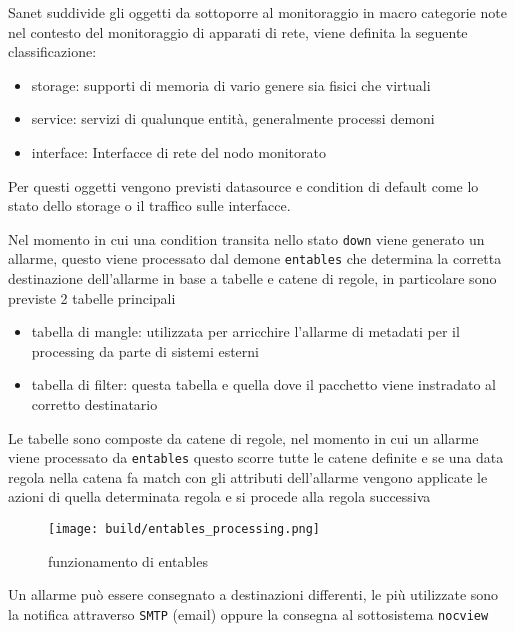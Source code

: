 Sanet suddivide gli oggetti da sottoporre al monitoraggio in macro categorie note nel contesto del monitoraggio di apparati di rete, viene definita la seguente classificazione:

\begin{itemize}
  \item storage: supporti di memoria di vario genere sia fisici che virtuali
  \item service: servizi di qualunque entità, generalmente processi demoni
  \item interface: Interfacce di rete del nodo monitorato
\end{itemize}

Per questi oggetti vengono previsti datasource e condition di default come lo stato dello storage o il traffico sulle interfacce.

Nel momento in cui una condition transita nello stato \verb|down| viene generato un allarme, questo viene processato dal demone \verb|entables| che determina la corretta destinazione dell'allarme in base a tabelle e catene di regole, in particolare sono previste 2 tabelle principali

\begin{itemize}
  \item tabella di mangle: utilizzata per arricchire l'allarme di metadati per il processing da parte di sistemi esterni
  \item tabella di filter: questa tabella e quella dove il pacchetto viene instradato al corretto destinatario
\end{itemize}

Le tabelle sono composte da catene di regole, nel momento in cui un allarme viene processato da \verb|entables| questo scorre tutte le catene definite e se una data regola nella catena fa match con gli attributi dell'allarme vengono applicate le azioni di quella determinata regola e si procede alla regola successiva

\begin{figure}[H]
    \centering
    \texttt{[image: build/entables\_processing.png]}
    \caption{funzionamento di entables}
    \label{fig:enter-label}
\end{figure}

Un allarme può essere consegnato a destinazioni differenti, le più utilizzate sono la notifica attraverso \verb|SMTP| (email) oppure la consegna al sottosistema \verb|nocview|

